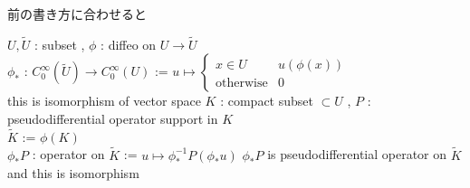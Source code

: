 前の書き方に合わせると
\begin{Theorem}
\itemdefi
  \For \(U , \tilde{U}\) : subset , \(\phi\) : diffeo on \(U \to \tilde{U}\) \\
  \Define \(\phi_*\) : \(C^\infty_0(\tilde{U}) \to C^\infty_0(U)\) :=
  \(u \mapsto
  \left\{
    \begin{array}{ll}
    x \in U & u(\phi(x)) \\
    \text{otherwise} & 0
    \end{array}
  \right.\) \\
  \Then this is isomorphism of vector space
\itemdefi
  \For \(K\) : compact subset \(\subset U\) , \(P\) : pseudodifferential operator support in \(K\) \\
  \Let \(\tilde{K}\) := \(\phi(K)\) \\
  \Define \(\phi_* P\) : operator on \(\tilde{K}\) := \(u \mapsto \phi_*^{-1} P(\phi_* u)\)
\itemprop
  \Then \(\phi_* P\) is pseudodifferential operator on \(\tilde{K}\) \\
  \Then and this is isomorphism
\end{Theorem}

